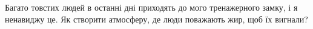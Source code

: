 \documentclass[border=0pt,varwidth=15.4cm]{standalone}
\begin{document}
\fontsize{10}{13}\selectfont
\raggedright Багато товстих людей в останні дні приходять до мого тренажерного замку, і я ненавиджу це. Як створити атмосферу, де люди поважають жир, щоб їх вигнали?
\end{document}
